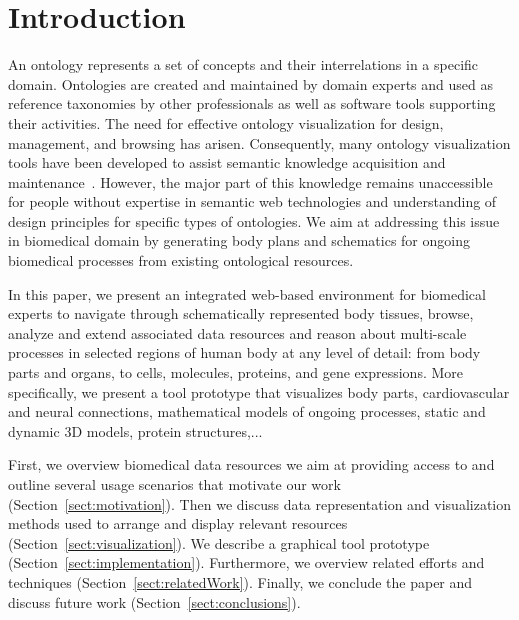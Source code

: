 \section{Introduction}

An ontology represents a set of concepts and their interrelations in a specific domain. 
Ontologies are created and maintained by domain experts and used as reference taxonomies by other professionals as well as software tools supporting their activities. The need for effective ontology visualization for design, management, and browsing has arisen.
Consequently, many ontology visualization tools have been developed to assist semantic knowledge acquisition and maintenance~\cite{KHL+07}.
However, the major part of this knowledge remains unaccessible for people without expertise in semantic web technologies and understanding of design principles for specific types of ontologies. We aim at addressing this issue in biomedical domain by generating body plans and schematics for ongoing biomedical processes from existing ontological resources.

In this paper, we present an integrated web-based environment for biomedical experts to navigate through schematically represented body tissues, browse, analyze and extend associated data resources and reason about multi-scale processes in selected regions of human body at any level of detail: from body parts and organs, to cells, molecules, proteins, and gene expressions. More specifically, we present a tool prototype that visualizes body parts, cardiovascular and neural connections, mathematical models of ongoing processes, static and dynamic 3D models, protein structures,... 

First, we overview biomedical data resources we aim at providing access to and outline several usage scenarios that motivate our work (Section~\ref{sect:motivation}).
Then we discuss data representation and visualization methods used to arrange and display relevant resources (Section~\ref{sect:visualization}). We describe a graphical tool prototype (Section~\ref{sect:implementation}).
Furthermore, we overview related efforts and techniques (Section~\ref{sect:relatedWork}). 
Finally, we conclude the paper and discuss future work (Section~\ref{sect:conclusions}).

